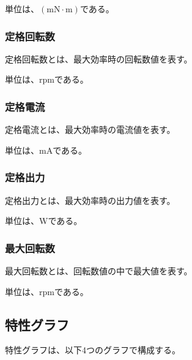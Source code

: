 単位は、$(\mathrm{mN \cdot m})$である。
\subsubsection{定格回転数}\label{sub:sub:teikakukaiten}
定格回転数とは、最大効率時の回転数値を表す。

単位は、$\mathrm{rpm}$である。

\subsubsection{定格電流}\label{sub:sub:teikakuden}
定格電流とは、最大効率時の電流値を表す。

単位は、$\mathrm{mA}$である。
\subsubsection{定格出力}\label{sub:sub:teikakusyutu}
定格出力とは、最大効率時の出力値を表す。

単位は、$\mathrm{W}$である。
\subsubsection{最大回転数}\label{sub:sub:saidaikai}
最大回転数とは、回転数値の中で最大値を表す。

単位は、$\mathrm{rpm}$である。
\subsection{特性グラフ}\label{sub:tokuseigurahu}
特性グラフは、以下4つのグラフで構成する。
